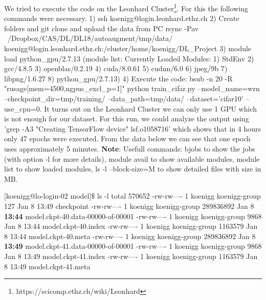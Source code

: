 \documentclass[10pt,twocolumn,letterpaper]{article}
\begin{document}
We tried to execute the code on the Leonhard Cluster\footnote{https://scicomp.ethz.ch/wiki/Leonhard}. For this the following commands were necessary. 1) ssh koenigg@login.leonhard.ethz.ch 2) Create folders and git clone and upload the data from PC rsync -Pav ~/Dropbox/CAS/DL/DL18/autoaugment/tmp/data/ koenigg@login.leonhard.ethz.ch:/cluster/home/koenigg/DL\_Project 3) module load python\_gpu/2.7.13 (module list: Currently Loaded Modules: 1) StdEnv   2) gcc/4.8.5   3) openblas/0.2.19   4) cuda/8.0.61   5) cudnn/6.0   6) jpeg/9b   7) libpng/1.6.27   8) python\_gpu/2.7.13) 4) Execute the code: bsub -n 20 -R "rusage[mem=4500,ngpus\_excl\_p=1]" python train\_cifar.py --model\_name=wrn --checkpoint\_dir=tmp/training/ --data\_path=tmp/data/ --dataset='cifar10' --use\_cpu=0. It turns out on the Leonhard Cluster we can only use 1 GPU which is not enough for our dataset. For this run, we could analyze the output using 'grep -A3 "Creating TensorFlow device" lsf.o1058716' which shows that in 4 hours only 47 epochs were executed. From the data below we can see that one epoch uses approximately 5 minutes. \textbf{Note}: Usefull commands: bjobs to show the jobs (with option -l for more details), module avail to show available modules, module list to show loaded modules, ls -l --block-size=M to show detailed files with size in MB. \newline

[koenigg@lo-login-02 model]\$ ls -l
total 570652
-rw-rw---- 1 koenigg koenigg-group       127 Jan  8 13:49 checkpoint
-rw-rw---- 1 koenigg koenigg-group 289836892 Jan  8 \textbf{13:44} model.ckpt-40.data-00000-of-00001
-rw-rw---- 1 koenigg koenigg-group      9868 Jan  8 13:44 model.ckpt-40.index
-rw-rw---- 1 koenigg koenigg-group   1163579 Jan  8 13:44 model.ckpt-40.meta
-rw-rw---- 1 koenigg koenigg-group 289836892 Jan  8 \textbf{13:49} model.ckpt-41.data-00000-of-00001
-rw-rw---- 1 koenigg koenigg-group      9868 Jan  8 13:49 model.ckpt-41.index
-rw-rw---- 1 koenigg koenigg-group   1163579 Jan  8 13:49 model.ckpt-41.meta




{\small


}
\end{document}
